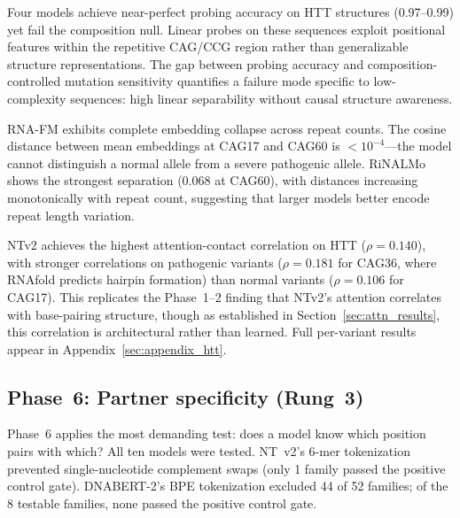 \documentclass[11pt]{article}
\begin{document}
Four models achieve near-perfect probing accuracy on HTT structures
(0.97--0.99) yet fail the composition null.  Linear probes
on these sequences exploit positional features within the repetitive
CAG/CCG region rather than generalizable structure representations.
The gap between probing accuracy and composition-controlled
mutation sensitivity quantifies a failure mode specific to
low-complexity sequences: high linear separability without causal
structure awareness.

RNA-FM exhibits complete embedding collapse across repeat counts.
The cosine distance between mean embeddings at CAG17 and CAG60 is
$< 10^{-4}$---the model cannot distinguish a normal allele from a
severe pathogenic allele.  RiNALMo shows the strongest separation
(0.068 at CAG60), with distances increasing monotonically with
repeat count, suggesting that larger models better encode repeat
length variation.

NTv2 achieves the highest attention-contact correlation on HTT
($\rho = 0.140$), with stronger correlations on pathogenic variants
($\rho = 0.181$ for CAG36, where RNAfold predicts hairpin formation)
than normal variants ($\rho = 0.106$ for CAG17).  This replicates
the Phase~1--2 finding that NTv2's attention correlates with
base-pairing structure, though as established in Section~\ref{sec:attn_results},
this correlation is architectural rather than learned.
Full per-variant results appear in Appendix~\ref{sec:appendix_htt}.


\subsection{Phase~6: Partner specificity (Rung~3)}
\label{sec:rung3_results}

Phase~6 applies the most demanding test: does a model know which
position pairs with which?  All ten models were tested.
NT~v2's 6-mer tokenization prevented single-nucleotide complement
swaps (only 1 family passed the positive control gate).
DNABERT-2's BPE tokenization excluded 44 of 52 families; of the 8
testable families, none passed the positive control gate.
\end{document}
